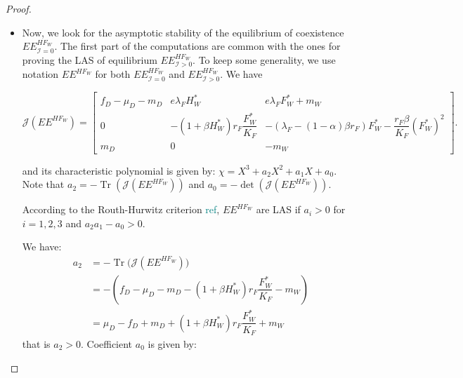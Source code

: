 \documentclass{article}
\newcommand{\lfw}{\lambda_{F}}
\newcommand{\lfw}{\lambda_{F}}
\newcommand{\cI}{\mathcal{I}}
\newcommand{\marc}[1]{\textcolor{teal}{#1}}
\DeclareMathOperator{\Tr}{Tr}
\begin{document}
\begin{proof}
\begin{itemize}
\item Now, we look for the asymptotic stability of the equilibrium of coexistence $EE^{HF_W}_{\cI=0}$. The first part of the computations are common with the ones for proving the LAS of equilibrium $EE^{HF_W}_{\cI >0}$.   To keep some generality, we use notation $EE^{HF_W}$ for both $EE^{HF_W}_{\cI =0}$ and $EE^{HF_W}_{\cI >0}$. We have


\begin{equation*}
\mathcal{J}(EE^{H F_W}) = \begin{bmatrix}
f_D -\mu_D - m_D & e \lfw H_W^* & e \lfw F^*_W +m_W \\
0 & -(1 + \beta H_W^*)r_F \dfrac{F_W^*}{K_F} & - (\lfw - (1-\alpha)\beta r_F) F_W^* -  \dfrac{r_F\beta}{K_F} (F_W^*)^2 \\
m_D & 0 & -m_W
\end{bmatrix}.
\end{equation*} 

and its characteristic polynomial is given by: $\chi = X^3 + a_2 X^2 + a_1 X + a_0$. Note that $a_2 = - \Tr(\mathcal{J}(EE^{H F_W}))$ and $a_0 = - \det (\mathcal{J}(EE^{H F_W}))$.

According to the Routh-Hurwitz criterion \marc{ref}, $EE^{H F_W}$ are LAS if $a_i > 0$ for $i=1,2,3$ and $a_2 a_1 - a_0 > 0$.

We have:
\begin{align}
a_2 &= - \Tr\Big(\mathcal{J}(EE^{H F_W})\Big) \\
 &= -(f_D - \mu_D - m_D - (1+\beta H_W^*)r_F \dfrac{F_W^*}{K_F} - m_W) \\
 &= \mu_D - f_D + m_D + (1+\beta H_W^*)r_F \dfrac{F_W^*}{K_F} + m_W \label{expressionA2}
\end{align}
that is $a_2>0$. Coefficient $a_0$ is given by:


\end{itemize}
\end{proof}
\end{document}
